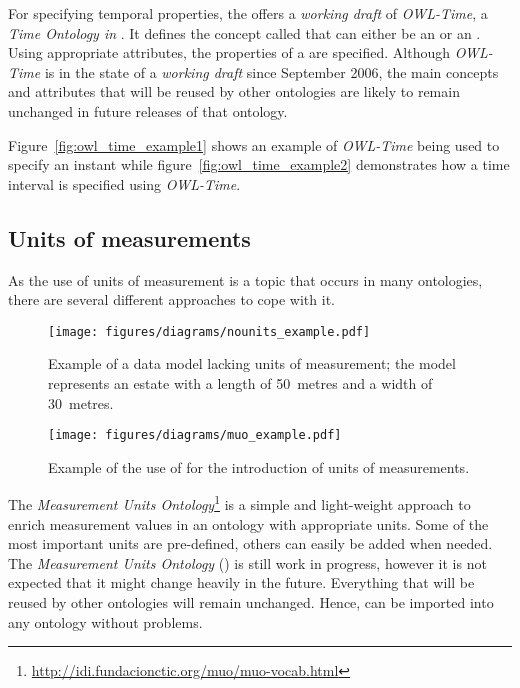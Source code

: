 For specifying temporal properties, the  offers a \emph{working draft} of \emph{OWL-Time}\cite{owl-time}, a \emph{Time Ontology in }. It defines the concept called  that can either be an  or an . Using appropriate attributes, the properties of a  are specified. Although \emph{OWL-Time} is in the state of a \emph{working draft} since September 2006, the main concepts and attributes that will be reused by other ontologies are likely to remain unchanged in future releases of that ontology.

Figure~\ref{fig:owl_time_example1} shows an example of \emph{OWL-Time} being used to specify an instant while figure~\ref{fig:owl_time_example2} demonstrates how a time interval is specified using \emph{OWL-Time}.

\subsection{Units of measurements}
\label{subsec:unit_ontologies}

As the use of units of measurement is a topic that occurs in many ontologies, there are several different approaches to cope with it.

\begin{figure}
\centering
\texttt{[image: figures/diagrams/nounits\_example.pdf]}
\caption{Example of a data model lacking units of measurement; the model represents an estate with a length of \SI{50}{metres} and a width of \SI{30}{metres}.}
\label{fig:nounits_example}
\end{figure}

\begin{figure}
\centering
\texttt{[image: figures/diagrams/muo\_example.pdf]}
\caption{Example of the use of \muo for the introduction of units of measurements.}
\label{fig:muo_example}
\end{figure}

The \emph{Measurement Units Ontology}\footnote{\href{http://idi.fundacionctic.org/muo/muo-vocab.html}{http://idi.fundacionctic.org/muo/muo-vocab.html}}\cite{MUO} is a simple and light-weight approach to enrich measurement values in an ontology with appropriate units. Some of the most important units are pre-defined, others can easily be added when needed. The \emph{Measurement Units Ontology} (\muo) is still work in progress, however it is not expected that it might change heavily in the future. Everything that will be reused by other ontologies will remain unchanged. Hence, \muo can be imported into any ontology without problems.

